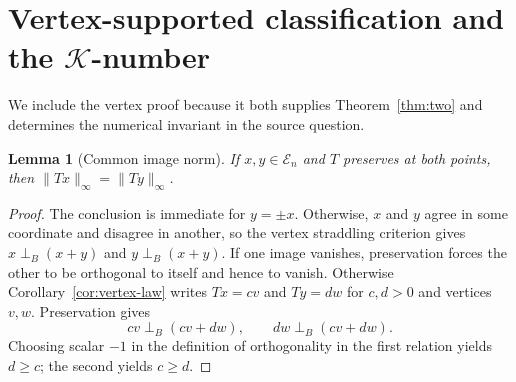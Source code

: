 \documentclass[11pt]{article}
\newtheorem{lemma}[theorem]{Lemma}
\theoremstyle{definition}
\theoremstyle{remark}
\newcommand{\E}{\mathcal E_n}
\newcommand{\K}{\mathcal K}
\newcommand{\perpB}{\perp_B}
\begin{document}
\section{Vertex-supported classification and the \texorpdfstring{$\K$}{K}-number}

We include the vertex proof because it both supplies Theorem~\ref{thm:two}
and determines the numerical invariant in the source question.

\begin{lemma}[Common image norm]\label{lem:common-norm}
If $x,y\in\E$ and $T$ preserves at both points, then
$\|Tx\|_\infty=\|Ty\|_\infty$.
\end{lemma}

\begin{proof}
The conclusion is immediate for $y=\pm x$.  Otherwise, $x$ and $y$ agree in
some coordinate and disagree in another, so the vertex straddling criterion
gives $x\perpB(x+y)$ and $y\perpB(x+y)$.  If one image vanishes,
preservation forces the other to be orthogonal to itself and hence to vanish.
Otherwise Corollary~\ref{cor:vertex-law} writes
$Tx=cv$ and $Ty=dw$ for $c,d>0$ and vertices $v,w$.  Preservation gives
\[
 cv\perpB(cv+dw),\qquad dw\perpB(cv+dw).
\]
Choosing scalar $-1$ in the definition of orthogonality in the first
relation yields $d\geq c$; the second yields $c\geq d$.
\end{proof}
\end{document}
